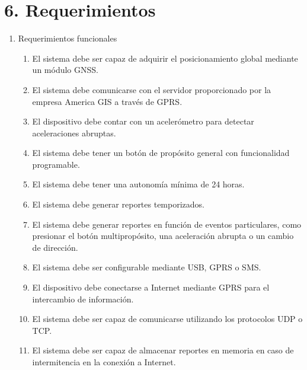\documentclass[
11pt, %
codirector, %
]{charter}
\begin{document}
\section{6. Requerimientos}
\label{sec:requerimientos}

\begin{enumerate}
\item Requerimientos funcionales
    \begin{enumerate}
    \item El sistema debe ser capaz de adquirir el posicionamiento global mediante un módulo GNSS.
    \item El sistema debe comunicarse con el servidor proporcionado por la empresa America GIS a través de GPRS.
    \item El dispositivo debe contar con un acelerómetro para detectar aceleraciones abruptas.
    \item El sistema debe tener un botón de propósito general con funcionalidad programable.
    \item El sistema debe tener una autonomía mínima de 24 horas.
    \item El sistema debe generar reportes temporizados.
    \item El sistema debe generar reportes en función de eventos particulares, como presionar el botón multipropósito, una aceleración abrupta o un cambio de dirección.
    \item El sistema debe ser configurable mediante USB, GPRS o SMS.
    \item El dispositivo debe conectarse a Internet mediante GPRS para el intercambio de información.
    \item El sistema debe ser capaz de comunicarse utilizando los protocolos UDP o TCP.
    \item El sistema debe ser capaz de almacenar reportes en memoria en caso de intermitencia en la conexión a Internet.
    \end{enumerate}


\end{enumerate}
\end{document}
